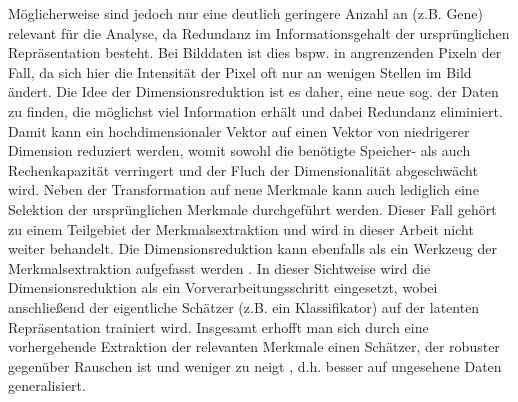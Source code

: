 Möglicherweise sind jedoch nur eine deutlich geringere Anzahl an  (z.B. Gene)
relevant für die Analyse, da Redundanz im Informationsgehalt der ursprünglichen Repräsentation
besteht. Bei Bilddaten ist dies bspw. in angrenzenden Pixeln der Fall, da sich hier die Intensität
der Pixel oft nur an wenigen Stellen im Bild ändert. Die Idee der Dimensionsreduktion ist es daher,
eine neue sog.  der Daten zu finden, die möglichst viel Information
erhält und dabei Redundanz eliminiert. Damit kann ein hochdimensionaler Vektor auf einen Vektor von
niedrigerer Dimension reduziert werden, womit sowohl die benötigte Speicher- als auch
Rechenkapazität verringert und der Fluch der Dimensionalität abgeschwächt wird. Neben der
Transformation auf neue Merkmale kann auch lediglich eine Selektion der ursprünglichen Merkmale
durchgeführt werden. Dieser Fall gehört zu einem Teilgebiet der Merkmalsextraktion \parencite{Guyon.2006} und wird in dieser Arbeit nicht weiter behandelt. Die Dimensionsreduktion kann
ebenfalls als ein Werkzeug der Merkmalsextraktion aufgefasst werden \parencite[3]{Guyon.2006b}. In dieser Sichtweise wird die Dimensionsreduktion als ein
Vorverarbeitungsschritt eingesetzt, wobei anschließend der eigentliche Schätzer (z.B. ein
Klassifikator) auf der latenten Repräsentation trainiert wird. Insgesamt erhofft man sich durch
eine vorhergehende Extraktion der relevanten Merkmale einen Schätzer, der robuster gegenüber
Rauschen ist und weniger zu  neigt \parencites[siehe][]{Plastria.2008}{MustafaAbdulSalam.2021}, d.h. besser auf ungesehene Daten
generalisiert.


